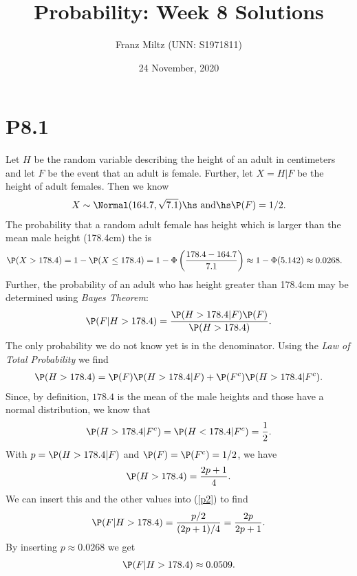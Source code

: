 \documentclass{article}
\begin{document}
\title{Probability: Week 8 Solutions}
\author{Franz Miltz (UNN: S1971811)}
\date{24 November, 2020}
\maketitle

\section*{P8.1}

Let $H$ be the random variable describing the height of an adult in centimeters
and let $F$ be the event that an adult is female. Further, let $X=H|F$ be the
height of adult females. Then we know
\begin{align*}
  X \sim \Normal(164.7, \sqrt{7.1})
  \text{\hs and\hs}
  \P(F) = 1/2.
\end{align*}
The probability that a random adult female has height which is larger than
the mean male height (178.4cm) the is
\begin{align*}
  \P(X>178.4) &= 1 - \P(X \leq 178.4) = 1 - \Phi\left(\frac{178.4-164.7}{7.1}\right)
  \approx 1-\Phi(5.142) \approx 0.0268.
\end{align*}
Further, the probability of an adult who has height greater than 178.4cm
may be determined using \emph{Bayes Theorem}:
\begin{align}
  \label{p2}
  \P(F|H>178.4) = \frac{\P(H>178.4|F)\P(F)}{\P(H>178.4)}.
\end{align}
The only probability we do not know yet is in the denominator. Using the
\emph{Law of Total Probability} we find
\begin{align*}
  \P(H>178.4) = \P(F)\P(H>178.4|F) + \P(F^c)\P(H>178.4|F^c).
\end{align*}
Since, by definition, $178.4$ is the mean of the male heights and those
have a normal distribution, we know that
\begin{align*}
  \P(H>178.4|F^c) = \P(H<178.4|F^c)=\frac{1}{2}.
\end{align*}
With $p=\P(H>178.4|F)$ and $\P(F)=\P(F^c)=1/2$, we have
\begin{align*}
  \P(H>178.4) = \frac{2p+1}{4}.
\end{align*}
We can insert this and the other values into (\ref{p2}) to find 
\begin{align*}
  \P(F|H>178.4)=\frac{p/2}{(2p+1)/4}=\frac{2p}{2p+1}.
\end{align*}
By inserting $p\approx 0.0268$ we get
\begin{align*}
  \P(F|H>178.4)\approx 0.0509.
\end{align*}
\end{document}
